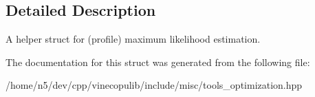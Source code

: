 \subsection{Detailed Description}
A helper struct for (profile) maximum likelihood estimation. 

The documentation for this struct was generated from the following file\+:\begin{DoxyCompactItemize}
\item 
/home/n5/dev/cpp/vinecopulib/include/misc/tools\+\_\+optimization.\+hpp\end{DoxyCompactItemize}
